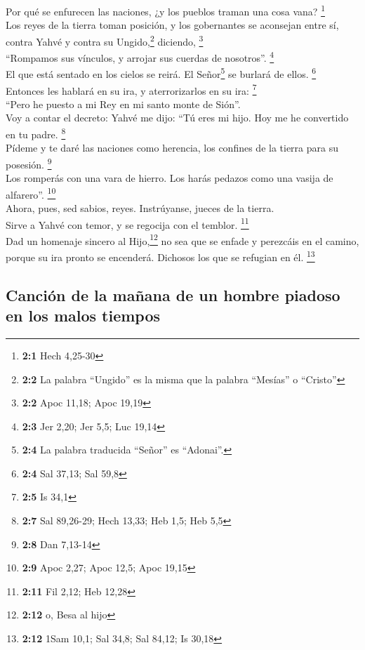  Por qué se enfurecen las naciones, ¿y los pueblos traman
una cosa vana? \footnote{\textbf{2:1} Hech 4,25-30}\\
 Los reyes de la tierra toman posición, y los gobernantes
se aconsejan entre sí, contra Yahvé y contra su Ungido,\footnote{\textbf{2:2}
  La palabra ``Ungido'' es la misma que la palabra ``Mesías'' o
  ``Cristo''} diciendo, \footnote{\textbf{2:2} Apoc 11,18; Apoc 19,19}\\
 ``Rompamos sus vínculos, y arrojar sus cuerdas de
nosotros''. \footnote{\textbf{2:3} Jer 2,20; Jer 5,5; Luc 19,14}\\
 El que está sentado en los cielos se reirá. El
Señor\footnote{\textbf{2:4} La palabra traducida ``Señor'' es
  ``Adonai''.} se burlará de ellos. \footnote{\textbf{2:4} Sal 37,13;
  Sal 59,8}\\
 Entonces les hablará en su ira, y aterrorizarlos en su
ira: \footnote{\textbf{2:5} Is 34,1}\\
 ``Pero he puesto a mi Rey en mi santo monte de Sión''.\\
 Voy a contar el decreto: Yahvé me dijo: ``Tú eres mi
hijo. Hoy me he convertido en tu padre. \footnote{\textbf{2:7} Sal
  89,26-29; Hech 13,33; Heb 1,5; Heb 5,5}\\
 Pídeme y te daré las naciones como herencia, los confines
de la tierra para su posesión. \footnote{\textbf{2:8} Dan 7,13-14}\\
 Los romperás con una vara de hierro. Los harás pedazos
como una vasija de alfarero''. \footnote{\textbf{2:9} Apoc 2,27; Apoc
  12,5; Apoc 19,15}\\
 Ahora, pues, sed sabios, reyes. Instrúyanse, jueces de
la tierra.\\
 Sirve a Yahvé con temor, y se regocija con el temblor.
\footnote{\textbf{2:11} Fil 2,12; Heb 12,28}\\
 Dad un homenaje sincero al Hijo,\footnote{\textbf{2:12}
  o, Besa al hijo} no sea que se enfade y perezcáis en el camino, porque
su ira pronto se encenderá. Dichosos los que se refugian en él.
\footnote{\textbf{2:12} 1Sam 10,1; Sal 34,8; Sal 84,12; Is 30,18}

\hypertarget{canciuxf3n-de-la-mauxf1ana-de-un-hombre-piadoso-en-los-malos-tiempos}{%
\subsection{Canción de la mañana de un hombre piadoso en los malos
tiempos}\label{canciuxf3n-de-la-mauxf1ana-de-un-hombre-piadoso-en-los-malos-tiempos}}

